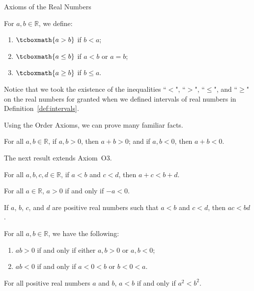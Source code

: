 \begin{section}{Axioms of the Real Numbers}
\begin{definition}
For $a,b\in\mathbb{R}$, we define:
\begin{enumerate}[label=\textrm{(\alph*)}]
\item $\tcboxmath{a>b}$ if $b<a$;
\item $\tcboxmath{a\leq b}$ if $a<b$ or $a=b$;
\item $\tcboxmath{a\geq b}$ if $b\leq a$.
\end{enumerate}
\end{definition}

Notice that we took the existence of the inequalities ``$<$", ``$>$", ``$\leq$", and ``$\geq$" on the real numbers for granted when we defined intervals of real numbers in Definition~\ref{def:intervals}.

Using the Order Axioms, we can prove many familiar facts. 

\begin{theorem}
For all $a,b\in\mathbb{R}$, if $a,b>0$, then $a+b>0$; and if $a,b<0$, then $a+b<0$.
\end{theorem}

The next result extends Axiom~O3.

\begin{theorem}
For all $a,b,c,d\in\mathbb{R}$, if $a<b$ and $c<d$, then $a+c<b+d$.
\end{theorem}

\begin{theorem}\label{thm:additive inverse of a positive is negative}
For all $a\in\mathbb{R}$, $a>0$ if and only if $-a<0$.
\end{theorem}

\begin{theorem}
If $a$, $b$, $c$, and $d$ are positive real numbers such that $a<b$ and $c<d$, then $ac<bd$.
\end{theorem}

\begin{theorem}
For all $a,b\in\mathbb{R}$, we have the following:
\begin{enumerate}[label=\textrm{(\alph*)}]
\item $ab>0$ if and only if either $a,b>0$ or $a,b<0$;
\item $ab<0$ if and only if $a<0<b$ or $b<0<a$.
\end{enumerate}
\end{theorem}

\begin{theorem}
For all positive real numbers $a$ and $b$, $a< b$ if and only if $a^2< b^2$.
\end{theorem}


\end{section}
